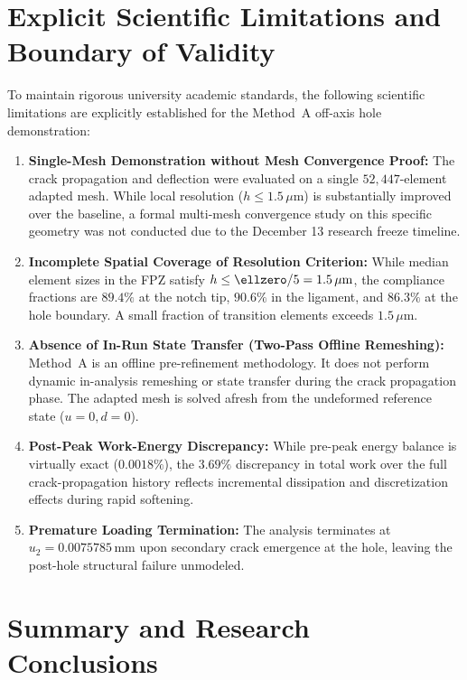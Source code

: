 \section{Explicit Scientific Limitations and Boundary of Validity}
\label{sec:hole_limitations}

To maintain rigorous university academic standards, the following scientific limitations are explicitly established for the Method~A off-axis hole demonstration:
\begin{enumerate}
  \item \textbf{Single-Mesh Demonstration without Mesh Convergence Proof:} The crack propagation and deflection were evaluated on a single $52{,}447$-element adapted mesh. While local resolution ($h \le 1.5\,\mu\mathrm{m}$) is substantially improved over the baseline, a formal multi-mesh convergence study on this specific geometry was not conducted due to the December 13 research freeze timeline.
  \item \textbf{Incomplete Spatial Coverage of Resolution Criterion:} While median element sizes in the FPZ satisfy $h \le \ellzero / 5 = 1.5\,\mu\mathrm{m}$, the compliance fractions are $89.4\%$ at the notch tip, $90.6\%$ in the ligament, and $86.3\%$ at the hole boundary. A small fraction of transition elements exceeds $1.5\,\mu\mathrm{m}$.
  \item \textbf{Absence of In-Run State Transfer (Two-Pass Offline Remeshing):} Method~A is an offline pre-refinement methodology. It does not perform dynamic in-analysis remeshing or state transfer during the crack propagation phase. The adapted mesh is solved afresh from the undeformed reference state ($u=0, d=0$).
  \item \textbf{Post-Peak Work-Energy Discrepancy:} While pre-peak energy balance is virtually exact ($0.0018\%$), the $3.69\%$ discrepancy in total work over the full crack-propagation history reflects incremental dissipation and discretization effects during rapid softening.
  \item \textbf{Premature Loading Termination:} The analysis terminates at $u_2 = 0.0075785\,\mathrm{mm}$ upon secondary crack emergence at the hole, leaving the post-hole structural failure unmodeled.
\end{enumerate}

\section{Summary and Research Conclusions}
\label{sec:hole_summary}

